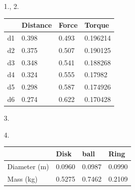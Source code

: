     \begin{itemize}
        \item [1., 2.]~\\
        
        \begin{center}
            \begin{tabular}{l | l | l | l}
                   & Distance & Force & Torque  \\ \hline
                d1 & 0.398 & 0.493 & 0.196214   \\ \hline
                d2 & 0.375 & 0.507 & 0.190125   \\ \hline
                d3 & 0.348 & 0.541 & 0.188268   \\ \hline
                d4 & 0.324 & 0.555 & 0.17982    \\ \hline
                d5 & 0.298 & 0.587 & 0.174926   \\ \hline
                d6 & 0.274 & 0.622 & 0.170428   
            \end{tabular}
        \end{center}

        \item[3.]~\\
        
        {\centering{}}

        \item[4.]~\\
        
        \begin{center}
            \begin{tabular}{l | l | l | l}
                & Disk & ball & Ring                    \\ \hline
                Diameter (m)& 0.0960 & 0.0987 & 0.0990  \\ \hline
                Mass (kg)   & 0.5275 & 0.7462 & 0.2109
            \end{tabular}
        \end{center}


\end{itemize}
